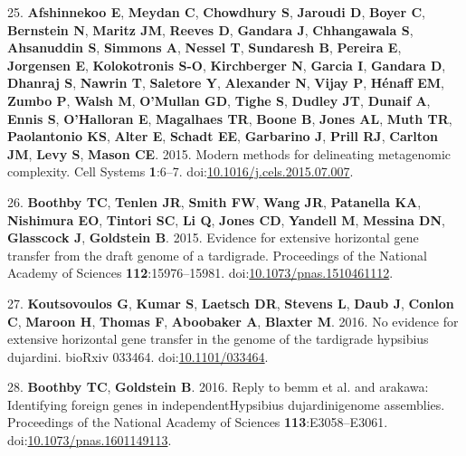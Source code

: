 \documentclass[11pt,]{article}
\begin{document}
\hypertarget{ref-Afshinnekoo2015b}{}
25. \textbf{Afshinnekoo E}, \textbf{Meydan C}, \textbf{Chowdhury S},
\textbf{Jaroudi D}, \textbf{Boyer C}, \textbf{Bernstein N},
\textbf{Maritz JM}, \textbf{Reeves D}, \textbf{Gandara J},
\textbf{Chhangawala S}, \textbf{Ahsanuddin S}, \textbf{Simmons A},
\textbf{Nessel T}, \textbf{Sundaresh B}, \textbf{Pereira E},
\textbf{Jorgensen E}, \textbf{Kolokotronis S-O}, \textbf{Kirchberger N},
\textbf{Garcia I}, \textbf{Gandara D}, \textbf{Dhanraj S},
\textbf{Nawrin T}, \textbf{Saletore Y}, \textbf{Alexander N},
\textbf{Vijay P}, \textbf{Hénaff EM}, \textbf{Zumbo P}, \textbf{Walsh
M}, \textbf{O'Mullan GD}, \textbf{Tighe S}, \textbf{Dudley JT},
\textbf{Dunaif A}, \textbf{Ennis S}, \textbf{O'Halloran E},
\textbf{Magalhaes TR}, \textbf{Boone B}, \textbf{Jones AL}, \textbf{Muth
TR}, \textbf{Paolantonio KS}, \textbf{Alter E}, \textbf{Schadt EE},
\textbf{Garbarino J}, \textbf{Prill RJ}, \textbf{Carlton JM},
\textbf{Levy S}, \textbf{Mason CE}. 2015. Modern methods for delineating
metagenomic complexity. Cell Systems \textbf{1}:6--7.
doi:\href{https://doi.org/10.1016/j.cels.2015.07.007}{10.1016/j.cels.2015.07.007}.

\hypertarget{ref-Boothby2015}{}
26. \textbf{Boothby TC}, \textbf{Tenlen JR}, \textbf{Smith FW},
\textbf{Wang JR}, \textbf{Patanella KA}, \textbf{Nishimura EO},
\textbf{Tintori SC}, \textbf{Li Q}, \textbf{Jones CD}, \textbf{Yandell
M}, \textbf{Messina DN}, \textbf{Glasscock J}, \textbf{Goldstein B}.
2015. Evidence for extensive horizontal gene transfer from the draft
genome of a tardigrade. Proceedings of the National Academy of Sciences
\textbf{112}:15976--15981.
doi:\href{https://doi.org/10.1073/pnas.1510461112}{10.1073/pnas.1510461112}.

\hypertarget{ref-Koutsovoulos2016a}{}
27. \textbf{Koutsovoulos G}, \textbf{Kumar S}, \textbf{Laetsch DR},
\textbf{Stevens L}, \textbf{Daub J}, \textbf{Conlon C}, \textbf{Maroon
H}, \textbf{Thomas F}, \textbf{Aboobaker A}, \textbf{Blaxter M}. 2016.
No evidence for extensive horizontal gene transfer in the genome of the
tardigrade hypsibius dujardini. bioRxiv 033464.
doi:\href{https://doi.org/10.1101/033464}{10.1101/033464}.

\hypertarget{ref-Boothby2016}{}
28. \textbf{Boothby TC}, \textbf{Goldstein B}. 2016. Reply to bemm et
al. and arakawa: Identifying foreign genes in independentHypsibius
dujardinigenome assemblies. Proceedings of the National Academy of
Sciences \textbf{113}:E3058--E3061.
doi:\href{https://doi.org/10.1073/pnas.1601149113}{10.1073/pnas.1601149113}.
\end{document}

